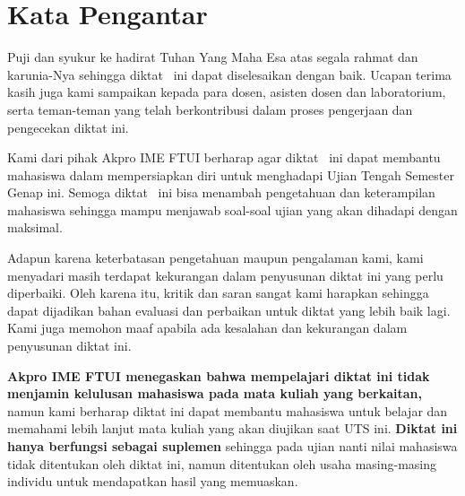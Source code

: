 \newpage


\section{Kata Pengantar}
Puji dan syukur ke hadirat Tuhan Yang Maha Esa atas segala rahmat dan karunia-Nya sehingga diktat \MyTitle\ ini dapat diselesaikan dengan baik. Ucapan terima kasih juga kami sampaikan kepada para dosen, asisten dosen dan laboratorium, serta teman-teman yang telah berkontribusi dalam proses pengerjaan dan pengecekan diktat ini.
\vspace{12pt}

Kami dari pihak Akpro IME FTUI berharap agar diktat \MyTitle\ ini dapat membantu mahasiswa dalam mempersiapkan diri untuk menghadapi Ujian Tengah Semester Genap ini. Semoga diktat \MyTitle\ ini bisa menambah pengetahuan dan keterampilan mahasiswa sehingga mampu menjawab soal-soal ujian yang akan dihadapi dengan maksimal.
\vspace{12pt}

Adapun karena keterbatasan pengetahuan maupun pengalaman kami, kami menyadari masih terdapat kekurangan dalam penyusunan diktat ini yang perlu diperbaiki. Oleh karena itu, kritik dan saran sangat kami harapkan sehingga dapat dijadikan bahan evaluasi dan perbaikan untuk diktat yang lebih baik lagi. Kami juga memohon maaf apabila ada kesalahan dan kekurangan dalam penyusunan diktat ini.
\vspace{12pt}

\textbf{Akpro IME FTUI menegaskan bahwa mempelajari diktat ini tidak menjamin kelulusan mahasiswa pada mata kuliah yang berkaitan,} namun kami berharap diktat ini dapat membantu mahasiswa untuk belajar dan memahami lebih lanjut mata kuliah yang akan diujikan saat UTS ini. \textbf{Diktat ini hanya berfungsi sebagai suplemen} sehingga pada ujian nanti nilai mahasiswa tidak ditentukan oleh diktat ini, namun ditentukan oleh usaha masing-masing individu untuk mendapatkan hasil yang memuaskan.\\
